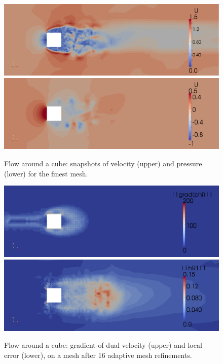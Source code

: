 \begin{figure}
\bwfig
  \centering
    \includegraphics[width=\largefig]{chapters/hoffman-1/png/fig2b.png}
  \medskip
    \includegraphics[width=\largefig]{chapters/hoffman-1/png/fig2c.png}
  \caption{Flow around a cube: snapshots of velocity (upper) and pressure
    (lower) for the finest mesh.}
  \label{hoffman-1:fig:cube2}
\end{figure}

\begin{figure}
\bwfig
  \centering
   \includegraphics[width=\largefig]{chapters/hoffman-1/png/fig3a.png}
  \medskip
\includegraphics[width=\largefig]{chapters/hoffman-1/png/fig3b.png}
  \caption{Flow around a cube: gradient of dual velocity (upper) and local
    error (lower), on a mesh after 16 adaptive mesh refinements.}
  \label{hoffman-1:fig:cube3}
\end{figure}

